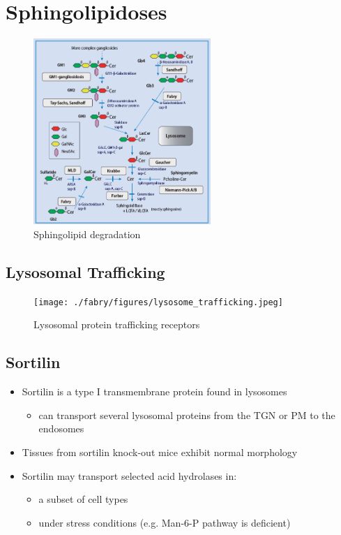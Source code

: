 \documentclass{scrartcl}
\begin{document}
\section{Sphingolipidoses}
\label{sec:org3391cea}

\begin{figure}[htbp]
\centering
\includegraphics[width=0.6\textwidth]{./figures/sl_degradation.png}
\caption{\label{fig:org001cb30}
Sphingolipid degradation}
\end{figure}

\subsection{Lysosomal Trafficking}
\label{sec:org7f397f1}

\begin{figure}[htbp]
\centering
\texttt{[image: ./fabry/figures/lysosome\_trafficking.jpeg]}
\caption[Lysosomal protein trafficking receptors]{\label{fig:orgfbc98fa}
Lysosomal protein trafficking receptors}
\end{figure}

\subsection{Sortilin}
\label{sec:orgf92fd93}

\begin{itemize}
\item Sortilin is a type I transmembrane protein found in lysosomes
\begin{itemize}
\item can transport several lysosomal proteins from the TGN or PM to the endosomes
\end{itemize}
\item Tissues from sortilin knock-out mice exhibit normal morphology
\item Sortilin may transport selected acid hydrolases in:
\begin{itemize}
\item a subset of cell types
\item under stress conditions (e.g. Man-6-P pathway is deficient)
\end{itemize}
\end{itemize}
\end{document}
